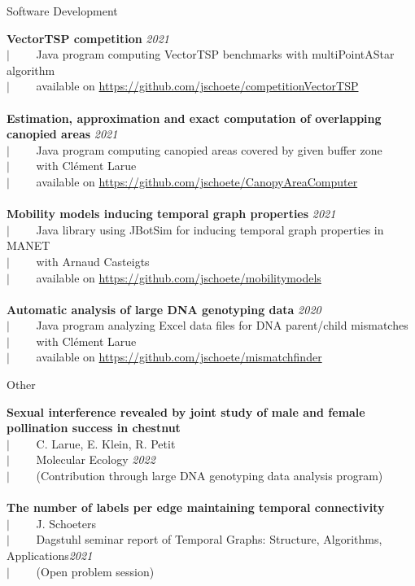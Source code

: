 \documentclass[french]{resume} %
\begin{document}
	\begin{rSection}{Software Development 
		}
		
		{\bf VectorTSP competition} \hfill {\em 2021}\\
		$| \qquad$ Java program computing VectorTSP benchmarks with multiPointAStar algorithm\\
		$| \qquad$ available on \url{https://github.com/jschoete/competitionVectorTSP}\\
		\\	
		{\bf Estimation, approximation and exact computation of overlapping canopied areas} \hfill {\em 2021}\\
		$| \qquad$ Java program computing canopied areas covered by given buffer zone\\
		$| \qquad$ with Clément Larue\\
		$| \qquad$ available on \url{https://github.com/jschoete/CanopyAreaComputer}\\
		\\	
		{\bf Mobility models inducing temporal graph properties} \hfill {\em 2021}\\
		$| \qquad$ Java library using JBotSim for inducing temporal graph properties in MANET\\
		$| \qquad$ with Arnaud Casteigts\\
		$| \qquad$ available on \url{https://github.com/jschoete/mobilitymodels}\\
		\\
		{\bf Automatic analysis of large DNA genotyping data} \hfill {\em 2020}\\
		$| \qquad$ Java program analyzing Excel data files for DNA parent/child mismatches\\
		$| \qquad$ with Clément Larue\\
		$| \qquad$ available on \url{https://github.com/jschoete/mismatchfinder}
	\end{rSection}
	
	\begin{rSection}{Other
		}
		
		{\bf {\small Sexual interference revealed by joint study of male and female pollination success in chestnut}}\\
		$| \qquad$ C. Larue, E. Klein, R. Petit\\
		$| \qquad$ Molecular Ecology \hfill {\em 2022}\\
		$| \qquad$ (Contribution through large DNA genotyping data analysis program)
		\\
		\\
		{\bf The number of labels per edge maintaining temporal connectivity}\\
		$| \qquad$ J. Schoeters\\
		$| \qquad$ Dagstuhl seminar report of Temporal Graphs: Structure, Algorithms, Applications\hfill {\em 2021}\\
		$| \qquad$ (Open problem session)
	\end{rSection}
	
\end{document}
